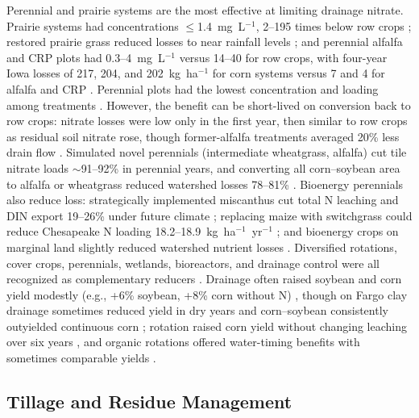 \documentclass[11pt]{article}
\begin{document}
Perennial and prairie systems are the most effective at limiting drainage nitrate. Prairie systems had concentrations $\le$1.4~mg~L$^{-1}$, 2--195 times below row crops \parencite{Daigh2015b}; restored prairie grass reduced losses to near rainfall levels \parencite{HernandezRamirez2011}; and perennial alfalfa and CRP plots had 0.3--4~mg~L$^{-1}$ versus 14--40 for row crops, with four-year Iowa losses of 217, 204, and 202~kg~ha$^{-1}$ for corn systems versus 7 and 4 for alfalfa and CRP \parencite{Randall2001}. Perennial plots had the lowest concentration and loading among treatments \parencite{Waring2024}. However, the benefit can be short-lived on conversion back to row crops: nitrate losses were low only in the first year, then similar to row crops as residual soil nitrate rose, though former-alfalfa treatments averaged 20\% less drain flow \parencite{Huggins2001}. Simulated novel perennials (intermediate wheatgrass, alfalfa) cut tile nitrate loads $\sim$91--92\% in perennial years, and converting all corn--soybean area to alfalfa or wheatgrass reduced watershed losses 78--81\% \parencite{Wilson2023}. Bioenergy perennials also reduce loss: strategically implemented miscanthus cut total N leaching and DIN export 19--26\% under future climate \parencite{Ferin2023}; replacing maize with switchgrass could reduce Chesapeake N loading 18.2--18.9~kg~ha$^{-1}$~yr$^{-1}$ \parencite{Woodbury2018}; and bioenergy crops on marginal land slightly reduced watershed nutrient losses \parencite{Guo2018}. Diversified rotations, cover crops, perennials, wetlands, bioreactors, and drainage control were all recognized as complementary reducers \parencite{Dinnes2002}. Drainage often raised soybean and corn yield modestly (e.g., +6\% soybean, +8\% corn without N) \parencite{Cassman2025}, though on Fargo clay drainage sometimes reduced yield in dry years and corn--soybean consistently outyielded continuous corn \parencite{Acharya2019b}; rotation raised corn yield without changing leaching over six years \parencite{Bakhsh2005}, and organic rotations offered water-timing benefits with sometimes comparable yields \parencite{Logsdon2021}.

\subsection{Tillage and Residue Management}
\end{document}
